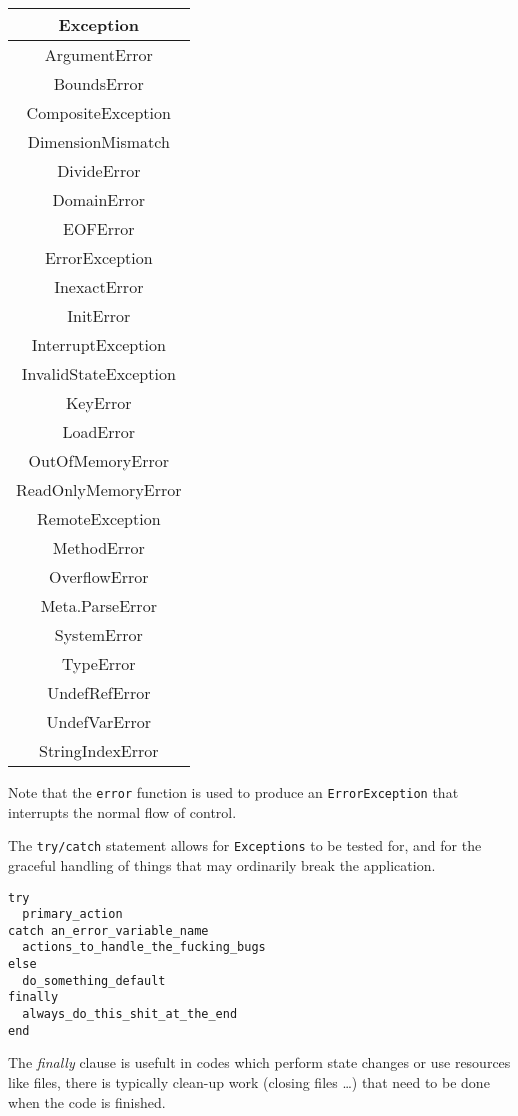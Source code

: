\documentclass[
]{article}
\begin{document}
\begin{longtable}[]{@{}c@{}}
\toprule\noalign{}
Exception \\
\midrule\noalign{}
\endhead
\bottomrule\noalign{}
\endlastfoot
ArgumentError \\
BoundsError \\
CompositeException \\
DimensionMismatch \\
DivideError \\
DomainError \\
EOFError \\
ErrorException \\
InexactError \\
InitError \\
InterruptException \\
InvalidStateException \\
KeyError \\
LoadError \\
OutOfMemoryError \\
ReadOnlyMemoryError \\
RemoteException \\
MethodError \\
OverflowError \\
Meta.ParseError \\
SystemError \\
TypeError \\
UndefRefError \\
UndefVarError \\
StringIndexError \\
\end{longtable}

Note that the \texttt{error} function is used to produce an
\texttt{ErrorException} that interrupts the normal flow of control.

The \texttt{try/catch} statement allows for \texttt{Exceptions} to be
tested for, and for the graceful handling of things that may ordinarily
break the application.

\begin{verbatim}
try
  primary_action
catch an_error_variable_name
  actions_to_handle_the_fucking_bugs
else
  do_something_default
finally
  always_do_this_shit_at_the_end
end
\end{verbatim}

The \emph{finally} clause is usefult in codes which perform state
changes or use resources like files, there is typically clean-up work
(closing files \ldots) that need to be done when the code is finished.
\end{document}
